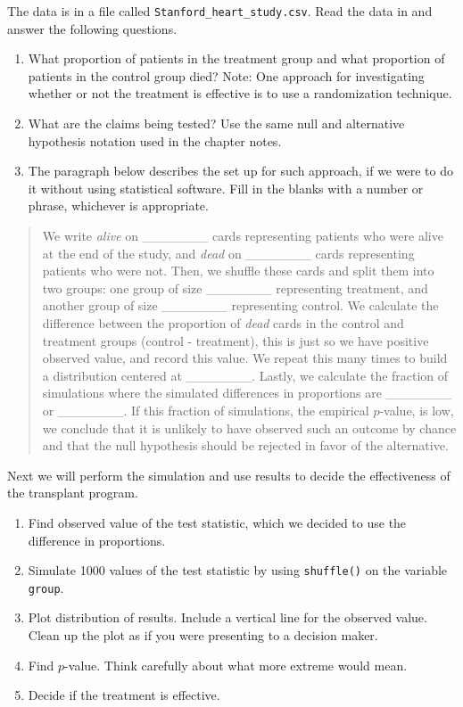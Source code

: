 \documentclass[
  letterpaper,
  DIV=11,
  numbers=noendperiod]{scrreprt}
\begin{document}
The data is in a file called \texttt{Stanford\_heart\_study.csv}. Read
the data in and answer the following questions.

\begin{enumerate}
\def\labelenumi{\alph{enumi}.}
\item
  What proportion of patients in the treatment group and what proportion
  of patients in the control group died? Note: One approach for
  investigating whether or not the treatment is effective is to use a
  randomization technique.
\item
  What are the claims being tested? Use the same null and alternative
  hypothesis notation used in the chapter notes.
\item
  The paragraph below describes the set up for such approach, if we were
  to do it without using statistical software. Fill in the blanks with a
  number or phrase, whichever is appropriate.
\end{enumerate}

\begin{quote}
We write \emph{alive} on \_\_\_\_\_\_\_ cards representing patients who
were alive at the end of the study, and \emph{dead} on \_\_\_\_\_\_\_
cards representing patients who were not. Then, we shuffle these cards
and split them into two groups: one group of size \_\_\_\_\_\_\_
representing treatment, and another group of size \_\_\_\_\_\_\_
representing control. We calculate the difference between the proportion
of \textit{dead} cards in the control and treatment groups (control -
treatment), this is just so we have positive observed value, and record
this value. We repeat this many times to build a distribution centered
at \_\_\_\_\_\_\_. Lastly, we calculate the fraction of simulations
where the simulated differences in proportions are \_\_\_\_\_\_\_ or
\_\_\_\_\_\_\_. If this fraction of simulations, the empirical
\(p\)-value, is low, we conclude that it is unlikely to have observed
such an outcome by chance and that the null hypothesis should be
rejected in favor of the alternative.
\end{quote}

Next we will perform the simulation and use results to decide the
effectiveness of the transplant program.

\begin{enumerate}
\def\labelenumi{\alph{enumi}.}
\setcounter{enumi}{3}
\item
  Find observed value of the test statistic, which we decided to use the
  difference in proportions.
\item
  Simulate 1000 values of the test statistic by using \texttt{shuffle()}
  on the variable \texttt{group}.
\item
  Plot distribution of results. Include a vertical line for the observed
  value. Clean up the plot as if you were presenting to a decision
  maker.
\item
  Find \(p\)-value. Think carefully about what more extreme would mean.
\item
  Decide if the treatment is effective.
\end{enumerate}
\end{document}
